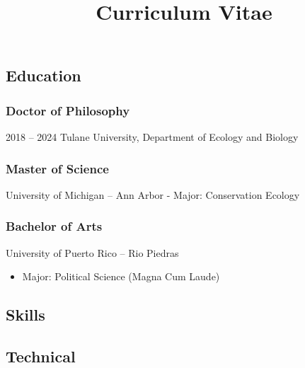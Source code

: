 \documentclass[
  letterpaper,
  DIV=11,
  numbers=noendperiod]{scrartcl}
\title{Curriculum Vitae}
\author{}
\date{}
\providecommand{\tightlist}{%
  \setlength{\itemsep}{0pt}\setlength{\parskip}{0pt}}\usepackage{longtable,booktabs,array}
\begin{document}
\maketitle

\subsection{\texorpdfstring{
Education}{ Education}}\label{education}

\subsubsection{Doctor of Philosophy}\label{doctor-of-philosophy}

{2018 -- 2024} Tulane University, Department of Ecology and Biology

\subsubsection{Master of Science}\label{master-of-science}

University of Michigan -- Ann Arbor - Major: Conservation Ecology

\subsubsection{Bachelor of Arts}\label{bachelor-of-arts}

University of Puerto Rico -- Rio Piedras

\begin{itemize}
\tightlist
\item
  Major: Political Science (Magna Cum Laude)
\end{itemize}

\subsection{\texorpdfstring{
Skills}{ Skills}}\label{skills}

\subsection{\texorpdfstring{
Technical}{ Technical}}\label{technical}
\end{document}
